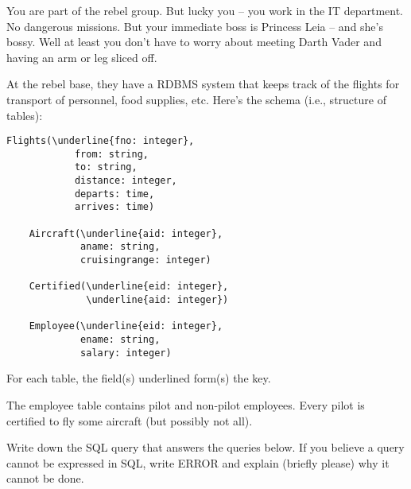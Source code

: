 
\newpage
You are part of the rebel group.
But lucky you -- you work in the IT department.
No dangerous missions.
But your immediate boss is Princess Leia -- and she's bossy.
Well at least you don't have to worry about meeting Darth Vader and having an arm or
leg
sliced off.

At the rebel base, they have a RDBMS system that keeps track of the flights
for transport of personnel, food supplies, etc.
Here's the schema (i.e., structure of tables):
\begin{Verbatim}[commandchars=\\\{\}]
    Flights(\underline{fno: integer},
            from: string,
            to: string,
            distance: integer,
            departs: time,
            arrives: time)
          
    Aircraft(\underline{aid: integer},
             aname: string,
             cruisingrange: integer)
           
    Certified(\underline{eid: integer},
              \underline{aid: integer})
            
    Employee(\underline{eid: integer},
             ename: string,
             salary: integer)
\end{Verbatim}
For each table, the field(s) underlined form(s) the key.

The employee table contains pilot and non-pilot employees.
Every pilot is certified to fly some aircraft (but possibly not all).

Write down the SQL query that answers the
queries below.
If you believe a query cannot be expressed in SQL,
write ERROR and explain (briefly please)
why it cannot be done.

